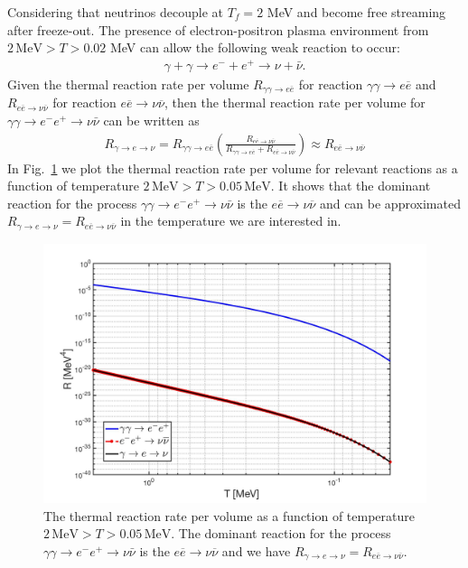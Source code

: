 Considering that neutrinos decouple at $T_f=2$ MeV and become free streaming after freeze-out. The presence of electron-positron plasma environment from $2\,\mathrm{MeV}>T>0.02$ MeV can allow the following weak reaction to occur:
\begin{align}
\gamma+\gamma\longrightarrow e^-+e^+\longrightarrow \nu+\bar{\nu}.
\end{align}
Given the  thermal reaction rate per volume $R_{\gamma\gamma\to e\overline{e}}$ for reaction $\gamma\gamma\to e\overline{e}$ and $R_{e\overline{e}\to\nu\overline{\nu}}$ for reaction $e\overline{e}\to\nu\overline{\nu}$, then the thermal reaction rate per volume for $\gamma\gamma\to e^-e^+\to\nu\bar{\nu}$ can be written as
\begin{align}
R_{\gamma\to e\to\nu}=R_{\gamma\gamma\to e\overline{e}}\left(\frac{R_{e\overline{e}\to\nu\overline{\nu}}}{R_{\gamma\gamma\to e\overline{e}}+R_{e\overline{e}\to\nu\overline{\nu}}}\right)\approx R_{e\overline{e}\to\nu\overline{\nu}}
\end{align}
In Fig.~\ref{ExtraNeutrinoRate} we plot the thermal reaction rate per volume for relevant reactions as a function of temperature $2\,\mathrm{MeV}>T>0.05\,\mathrm{MeV}$. It shows that the dominant reaction for the process $\gamma\gamma\to e^-e^+\to\nu\bar{\nu}$ is the $e\overline{e}\to\nu\overline{\nu}$ and can be approximated $R_{\gamma\to e\to\nu}=R_{e\overline{e}\to\nu\overline{\nu}}$ in the temperature we are interested in.
\begin{figure}[ht]
\begin{center}
\includegraphics[width=\textwidth]{./plots/Extra_neutrino_rate_volume}
\caption{The thermal reaction rate per volume as a function of temperature $2\,\mathrm{MeV}>T>0.05\,\mathrm{MeV}$. The dominant reaction for the process $\gamma\gamma\to e^-e^+\to\nu\bar{\nu}$ is the $e\overline{e}\to\nu\overline{\nu}$ and we have $R_{\gamma\to e\to\nu}=R_{e\overline{e}\to\nu\overline{\nu}}$.}
\label{ExtraNeutrinoRate}
\end{center}
\end{figure}

